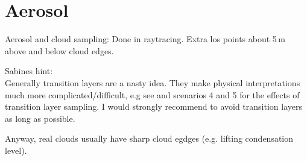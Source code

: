 \section{Aerosol}
\label{sec:Aerosol}

Aerosol and cloud sampling: Done in raytracing. Extra los points about 5\,m above and below cloud edges.

Sabines hint:\\
Generally transition layers are a nasty idea. They make physical interpretations much more complicated/difficult, e.g see \citet{Griessbach2013} and \citet{Hoepfner2009} scenarios 4 and 5 for the effects of transition layer sampling. I would strongly recommend to avoid transition layers as long as possible.

Anyway, real clouds usually have sharp cloud egdges (e.g. lifting condensation level).